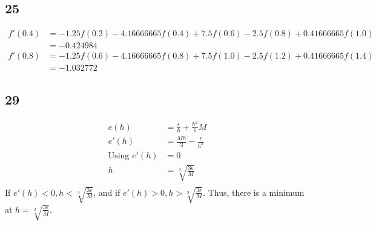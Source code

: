 \documentclass{oisinclass}
\begin{document}
\subsection*{25}
\begin{align*}
	f'(0.4) & = - 1.25 f{\left(0.2 \right)} - 4.16666665 f{\left(0.4 \right)} + 7.5 f{\left(0.6 \right)} - 2.5 f{\left(0.8 \right)} + 0.41666665 f{\left(1.0 \right)} \\
	        & = -0.424984                                                                                                                                             \\
	f'(0.8) & = - 1.25 f{\left(0.6 \right)} - 4.16666665 f{\left(0.8 \right)} + 7.5 f{\left(1.0 \right)} - 2.5 f{\left(1.2 \right)} + 0.41666665 f{\left(1.4 \right)} \\
	        & = -1.032772
\end{align*}
\subsection*{29}
\begin{align*}
	e(h)                & = \frac{\epsilon}{h} + \frac{h^2}{6}M    \\
	e'(h)               & = \frac{M h}{3} - \frac{\epsilon}{h^{2}} \\
	\text{Using } e'(h) & = 0                                      \\
	h                   & = \sqrt[3]{\frac{3\epsilon}{M}}          \\
\end{align*}
If \(e'(h) < 0, h < \sqrt[3]{\frac{3\epsilon}{M}}\), and if \(e'(h) > 0, h > \sqrt[3]{\frac{3\epsilon}{M}}\). Thus, there is a minimum at \( h= \sqrt[3]{\frac{3\epsilon}{M}} \).

\newpage
\end{document}
